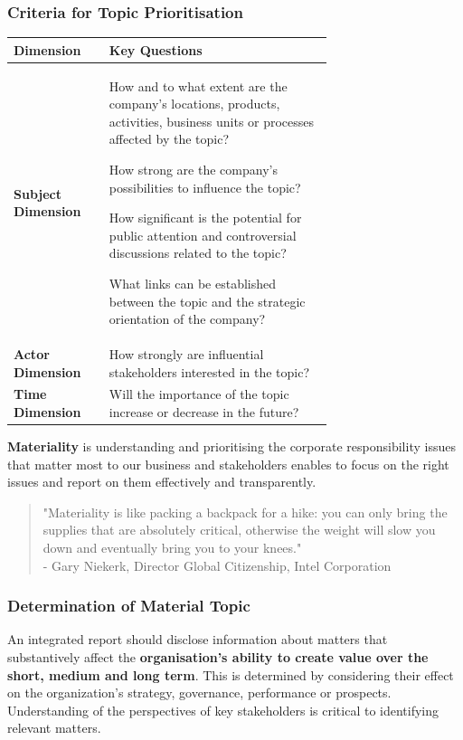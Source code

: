 \documentclass[11pt]{article}
\theoremstyle{definition}
\begin{document}
\subsubsection{Criteria for Topic Prioritisation}
\begin{tabularx}{\linewidth}{X p{0.7\linewidth}}
	\textbf{Dimension} & \textbf{Key Questions}\\
	\hline
	\textbf{Subject Dimension} & \begin{itemize}
		[
			left=0pt,
			nosep,
			before={\begin{minipage}[t]{\hsize}},
			after={\end{minipage}}
		]
		\item How and to what extent are the company's locations, products, activities, business units or processes affected by the topic?
		\item How strong are the company's possibilities to influence the topic?
		\item How significant is the potential for public attention and controversial discussions related to the topic?
		\item What links can be established between the topic and the strategic orientation of the company?
	\end{itemize}\\
	\textbf{Actor Dimension} & How strongly are influential stakeholders interested in the topic?\\
	\textbf{Time Dimension} & Will the importance of the topic increase or decrease in the future?
\end{tabularx}

\begin{definition}
	\textbf{Materiality} is understanding and prioritising the corporate responsibility issues that matter most to our business and stakeholders enables to focus on the right issues and report on them effectively and transparently.
\end{definition}

\noindent
\begin{quote}
	"Materiality is like packing a backpack for a hike: you can only bring the supplies that are absolutely critical, otherwise the weight will slow you down and eventually bring you to your knees."\\
	\hspace*{1em} - Gary Niekerk, Director Global Citizenship, Intel Corporation
\end{quote}

\subsubsection{Determination of Material Topic}
An integrated report should disclose information about matters that substantively affect the \textbf{organisation's ability to create value over the short, medium and long term}. This is determined by considering their effect on the organization's strategy, governance, performance or prospects. Understanding of the perspectives of key stakeholders is critical to identifying relevant matters.
\end{document}
